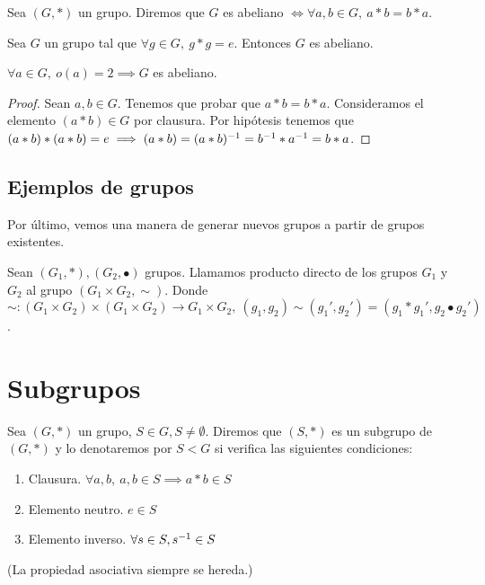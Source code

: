\begin{dfn}
	Sea $(G, \ast)$ un grupo. Diremos que $G$ es abeliano $\iff \forall a,b \in G,\ a \ast b = b \ast a$.
\end{dfn}

\begin{thm}
	\label{thm:abelianosdeorden2}
	Sea $G$ un grupo tal que $\forall g \in G,\ g \ast g = e$. Entonces $G$ es abeliano.
\end{thm}

\begin{cor}
	$\forall a \in G,\ o(a) = 2 \implies G$ es abeliano.
\end{cor}

\begin{proof}
	Sean $a,b \in G$. Tenemos que probar que $a\ast b = b \ast a$. Consideramos el elemento $(a \ast b) \in G$ por clausura. Por hipótesis tenemos que $(a \ast b) \ast (a \ast b) = e \implies (a \ast b) = (a \ast b)^{-1} = b^{-1} \ast a^{-1} = b \ast a$.
\end{proof}

\subsection{Ejemplos de grupos}



Por último, vemos una manera de generar nuevos grupos a partir de grupos existentes.

\begin{dfn}
	Sean $(G_1, \ast), (G_2, \bullet)$ grupos. Llamamos producto directo de los grupos $G_1$ y $G_2$ al grupo $(G_1\times G_2, \sim)$. Donde $\sim : (G_1 \times G_2) \times (G_1 \times G_2) \to G_1 \times G_2,\ (g_1, g_2) \sim (g_1', g_2') = (g_1\ast g_1', g_2 \bullet g_2')$.
\end{dfn}

\section{Subgrupos}

\begin{dfn}[Subgrupo]
	Sea $(G, \ast)$ un grupo, $S \in G, S \neq \emptyset$. Diremos que $(S, \ast)$ es un subgrupo de $(G, \ast)$ y lo denotaremos por $S < G$ si verifica las siguientes condiciones:
	\begin{enumerate}
		\item Clausura. $\forall a, b,\ a,b \in S \implies a \ast b \in S$
		\item Elemento neutro. $e \in S$
		\item Elemento inverso. $\forall s \in S, s^{-1} \in S$ 
	\end{enumerate}
	(La propiedad asociativa siempre se hereda.)
\end{dfn}

